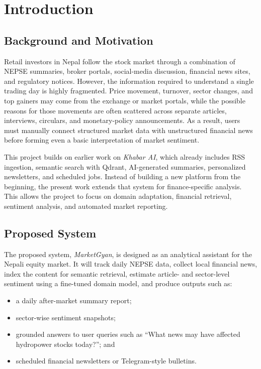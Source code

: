 \documentclass[12pt,a4paper]{report}
\begin{document}

\chapter{Introduction}

\section{Background and Motivation}
Retail investors in Nepal follow the stock market through a combination of \ac{NEPSE} summaries, broker portals, social-media discussion, financial news sites, and regulatory notices. However, the information required to understand a single trading day is highly fragmented. Price movement, turnover, sector changes, and top gainers may come from the exchange or market portals, while the possible reasons for those movements are often scattered across separate articles, interviews, circulars, and monetary-policy announcements. As a result, users must manually connect structured market data with unstructured financial news before forming even a basic interpretation of market sentiment.

This project builds on earlier work on \textit{Khabar AI}, which already includes \ac{RSS} ingestion, semantic search with Qdrant, AI-generated summaries, personalized newsletters, and scheduled jobs. Instead of building a new platform from the beginning, the present work extends that system for finance-specific analysis. This allows the project to focus on domain adaptation, financial retrieval, sentiment analysis, and automated market reporting.

\section{Proposed System}
The proposed system, \textit{MarketGyan}, is designed as an analytical assistant for the Nepali equity market. It will track daily \ac{NEPSE} data, collect local financial news, index the content for semantic retrieval, estimate article- and sector-level sentiment using a fine-tuned domain model, and produce outputs such as:
\begin{itemize}[leftmargin=1.6em]
    \item a daily after-market summary report;
    \item sector-wise sentiment snapshots;
    \item grounded answers to user queries such as ``What news may have affected hydropower stocks today?''; and
    \item scheduled financial newsletters or Telegram-style bulletins.
\end{itemize}
\end{document}
